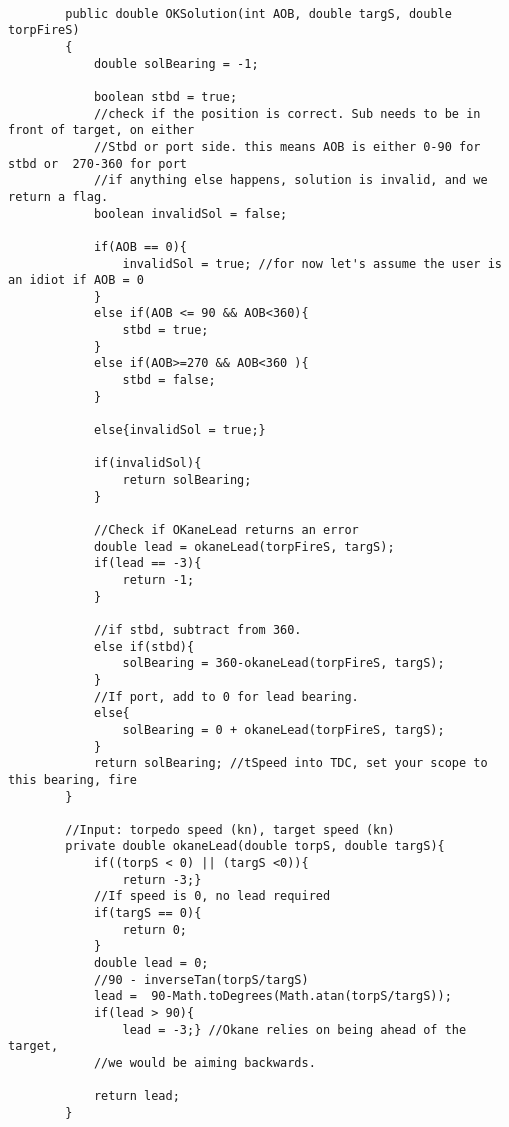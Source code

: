 \documentclass{article}
\begin{document}
\begin{lstlisting}

        public double OKSolution(int AOB, double targS, double torpFireS)
        {
            double solBearing = -1;

            boolean stbd = true;
            //check if the position is correct. Sub needs to be in front of target, on either
            //Stbd or port side. this means AOB is either 0-90 for stbd or  270-360 for port
            //if anything else happens, solution is invalid, and we return a flag.
            boolean invalidSol = false;
            
    		if(AOB == 0){
                invalidSol = true; //for now let's assume the user is an idiot if AOB = 0
    		}
    		else if(AOB <= 90 && AOB<360){
                stbd = true;
            }
            else if(AOB>=270 && AOB<360 ){
                stbd = false;
            }
            
            else{invalidSol = true;}

            if(invalidSol){
                return solBearing;
            }
            
            //Check if OKaneLead returns an error
            double lead = okaneLead(torpFireS, targS);
            if(lead == -3){
            	return -1;
            }
           
            //if stbd, subtract from 360.
            else if(stbd){
                solBearing = 360-okaneLead(torpFireS, targS);
            }
            //If port, add to 0 for lead bearing.
            else{
                solBearing = 0 + okaneLead(torpFireS, targS);
            }
            return solBearing; //tSpeed into TDC, set your scope to this bearing, fire
        }

        //Input: torpedo speed (kn), target speed (kn)
        private double okaneLead(double torpS, double targS){
            if((torpS < 0) || (targS <0)){
                return -3;}
            //If speed is 0, no lead required
            if(targS == 0){
            	return 0;
            }
            double lead = 0;
            //90 - inverseTan(torpS/targS)
            lead =  90-Math.toDegrees(Math.atan(torpS/targS));
            if(lead > 90){
                lead = -3;} //Okane relies on being ahead of the target,
            //we would be aiming backwards.

            return lead;
        }
 
\end{lstlisting}
\end{document}
